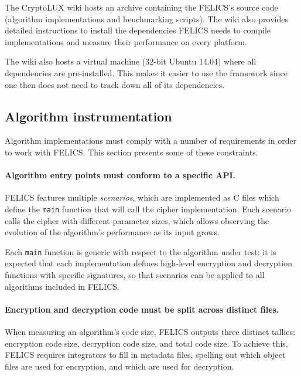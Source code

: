 \documentclass{article}
\begin{document}
The CryptoLUX wiki\cite{FELICS:wiki} hosts an archive containing the
FELICS's source code (algorithm implementations and benchmarking
scripts).  The wiki also provides detailed instructions to install the
dependencies FELICS needs to compile implementations and measure their
performance on every platform.

The wiki also hosts a virtual machine (32-bit Ubuntu 14.04) where all
dependencies are pre-installed.  This makes it easier to use the
framework since one then does not need to track down all of its
dependencies.

\subsection{Algorithm instrumentation}
\label{sec:felics/adding-algos}

Algorithm implementations must comply with a number of requirements in
order to work with FELICS.  This section presents some of these
constraints.

\paragraph{Algorithm entry points must conform to a specific API.}

FELICS features multiple \emph{scenarios}, which are implemented as C
files which define the \texttt{main} function that will call the
cipher implementation.  Each scenario calls the cipher with different
parameter sizes, which allows observing the evolution of the
algorithm's performance as its input grows.

Each \texttt{main} function is generic with respect to the algorithm
under test: it is expected that each implementation defines high-level
encryption and decryption functions with specific signatures, so that
scenarios can be applied to all algorithms included in FELICS.

\paragraph{Encryption and decryption code must be split across
  distinct files.}

When measuring an algorithm's code size, FELICS outputs three distinct
tallies: encryption code size, decryption code size, and total code
size.  To achieve this, FELICS requires integrators to fill in
metadata files, spelling out which object files are used for
encryption, and which are used for decryption.
\end{document}
